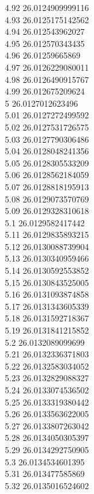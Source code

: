 {4.92	26.0124909999116\\
4.93	26.0125175142562\\
4.94	26.012543962027\\
4.95	26.012570343435\\
4.96	26.01259665869\\
4.97	26.0126229080011\\
4.98	26.0126490915767\\
4.99	26.012675209624\\
5	26.0127012623496\\
5.01	26.0127272499592\\
5.02	26.0127531726575\\
5.03	26.0127790306486\\
5.04	26.0128048241356\\
5.05	26.0128305533209\\
5.06	26.0128562184059\\
5.07	26.0128818195913\\
5.08	26.0129073570769\\
5.09	26.0129328310618\\
5.1	26.0129582417442\\
5.11	26.0129835893215\\
5.12	26.0130088739904\\
5.13	26.0130340959466\\
5.14	26.0130592553852\\
5.15	26.0130843525005\\
5.16	26.0131093874858\\
5.17	26.0131343605339\\
5.18	26.0131592718367\\
5.19	26.0131841215852\\
5.2	26.0132089099699\\
5.21	26.0132336371803\\
5.22	26.0132583034052\\
5.23	26.0132829088327\\
5.24	26.0133074536502\\
5.25	26.0133319380442\\
5.26	26.0133563622005\\
5.27	26.0133807263042\\
5.28	26.0134050305397\\
5.29	26.0134292750905\\
5.3	26.0134534601395\\
5.31	26.013477585869\\
5.32	26.0135016524602\\
}
